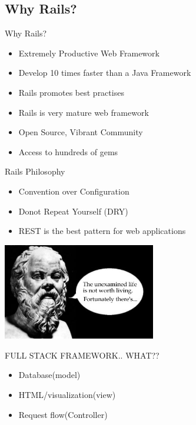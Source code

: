 \documentclass[xcolor=svgnames]{beamer}
\begin{document}
\subsection{Why Rails?}
\label{sub:Why Rails?}
\begin{frame}{Why Rails?}
  \begin{itemize}
 \item \alert<+>{Extremely Productive Web Framework } 
 \item \alert<+>{Develop 10 times faster than a Java Framework }
 \item \alert<+>{Rails promotes best practises } 
 \item \alert<+>{Rails is very mature web framework }
 \item \alert<+>{Open Source, Vibrant Community }
 \item \alert<+>{Access to hundreds of gems }

  \end{itemize}
	
\end{frame}
\begin{frame}{Rails Philosophy}
  \begin{itemize}
  	 \item \alert<+>{Convention over Configuration}
	 \item \alert<+>{Donot Repeat Yourself (DRY)}
	 \item \alert<+>{REST is the best pattern for web applications }
	
  \end{itemize}
  \begin{center}
  \includegraphics[width=0.5\textwidth]{socrates.jpg}	
  \end{center}
\end{frame}
\begin{frame}{FULL STACK FRAMEWORK.. WHAT??}
  \color{Maroon}{It abstracts and manages all parts of a web application}
	\begin{itemize}
		 \item \alert<+>{Database(model) }
		 \item \alert<+>{HTML/visualization(view) }
		 \item \alert<+>{Request flow(Controller) }

	\end{itemize}
\end{frame}
\end{document}

